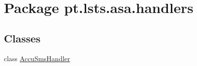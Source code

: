 \hypertarget{namespacept_1_1lsts_1_1asa_1_1handlers}{}\section{Package pt.\+lsts.\+asa.\+handlers}
\label{namespacept_1_1lsts_1_1asa_1_1handlers}
\subsection*{Classes}
\begin{DoxyCompactItemize}
\item 
class \hyperlink{classpt_1_1lsts_1_1asa_1_1handlers_1_1AccuSmsHandler}{Accu\+Sms\+Handler}
\end{DoxyCompactItemize}
